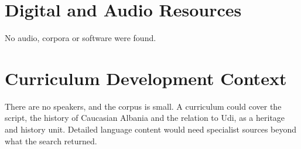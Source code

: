 \documentclass[12pt]{article}
\begin{document}
\section{Digital and Audio Resources}
No audio, corpora or software were found.

\section{Curriculum Development Context}
There are no speakers, and the corpus is small. A curriculum could cover the script, the history of Caucasian Albania and the relation to Udi, as a heritage and history unit. Detailed language content would need specialist sources beyond what the search returned.
\end{document}
